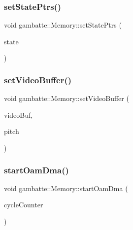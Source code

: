 \mbox{\label{classgambatte_1_1Memory_a1e277e1f1b72165fb334139471fc8418}} 
\subsubsection{\texorpdfstring{set\+State\+Ptrs()}{setStatePtrs()}}
{\footnotesize\ttfamily void gambatte\+::\+Memory\+::set\+State\+Ptrs (\begin{DoxyParamCaption}\item[{\hyperlink{structgambatte_1_1SaveState}{Save\+State} \&}]{state }\end{DoxyParamCaption})}

\mbox{\label{classgambatte_1_1Memory_a848742d4e0fcfa3a6bc47cccc5f3f40a}} 
\subsubsection{\texorpdfstring{set\+Video\+Buffer()}{setVideoBuffer()}}
{\footnotesize\ttfamily void gambatte\+::\+Memory\+::set\+Video\+Buffer (\begin{DoxyParamCaption}\item[{\hyperlink{namespacegambatte_a0639f09fccfbbd5a8e0796318768e370}{uint\+\_\+least32\+\_\+t} $\ast$const}]{video\+Buf,  }\item[{std\+::ptrdiff\+\_\+t}]{pitch }\end{DoxyParamCaption})\hspace{0.3cm}{\ttfamily [inline]}}

\mbox{\label{classgambatte_1_1Memory_a0c7ab1d1f0713c019097debfff8867b8}} 
\subsubsection{\texorpdfstring{start\+Oam\+Dma()}{startOamDma()}}
{\footnotesize\ttfamily void gambatte\+::\+Memory\+::start\+Oam\+Dma (\begin{DoxyParamCaption}\item[{unsigned}]{cycle\+Counter }\end{DoxyParamCaption})\hspace{0.3cm}{\ttfamily [private]}}


